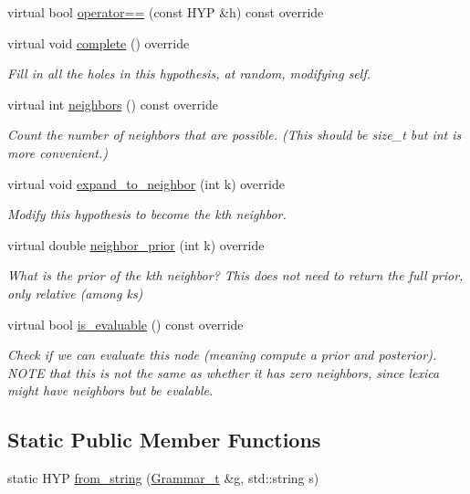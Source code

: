 \begin{DoxyCompactItemize}
virtual bool \hyperlink{class_l_o_t_hypothesis_acf5a682dce5d3971474a22778479a99a}{operator==} (const H\+YP \&h) const override
\item 
virtual void \hyperlink{class_l_o_t_hypothesis_a7f913b702b434003f94a84c560d16bf9}{complete} () override
\begin{DoxyCompactList}\small\item\em Fill in all the holes in this hypothesis, at random, modifying self. \end{DoxyCompactList}\item 
virtual int \hyperlink{class_l_o_t_hypothesis_a097cde606ec3f277fdeb92145599027f}{neighbors} () const override
\begin{DoxyCompactList}\small\item\em Count the number of neighbors that are possible. (This should be size\+\_\+t but int is more convenient.) \end{DoxyCompactList}\item 
virtual void \hyperlink{class_l_o_t_hypothesis_ab24d0b8faa360f6a0edc4eefb17d6de7}{expand\+\_\+to\+\_\+neighbor} (int k) override
\begin{DoxyCompactList}\small\item\em Modify this hypothesis to become the k\textquotesingle{}th neighbor. \end{DoxyCompactList}\item 
virtual double \hyperlink{class_l_o_t_hypothesis_a34fb9e13bc6855d6599c1c3e62d88933}{neighbor\+\_\+prior} (int k) override
\begin{DoxyCompactList}\small\item\em What is the prior of the k\textquotesingle{}th neighbor? This does not need to return the full prior, only relative (among ks) \end{DoxyCompactList}\item 
virtual bool \hyperlink{class_l_o_t_hypothesis_a9eeaaf321324d2418405f4d7252f6ca4}{is\+\_\+evaluable} () const override
\begin{DoxyCompactList}\small\item\em Check if we can evaluate this node (meaning compute a prior and posterior). N\+O\+TE that this is not the same as whether it has zero neighbors, since lexica might have neighbors but be evalable. \end{DoxyCompactList}\end{DoxyCompactItemize}
\subsection*{Static Public Member Functions}
\begin{DoxyCompactItemize}
\item 
static H\+YP \hyperlink{class_l_o_t_hypothesis_aa1e3f898618de841bfd8c9279a107211}{from\+\_\+string} (\hyperlink{class_l_o_t_hypothesis_a8006204013d471860e54c49d19edbace}{Grammar\+\_\+t} \&g, std\+::string s)
\end{DoxyCompactItemize}
